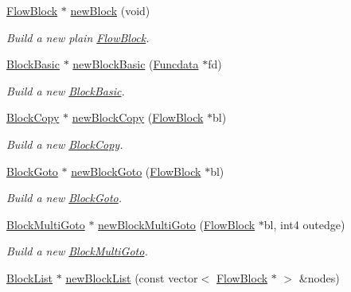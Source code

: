 \begin{DoxyCompactItemize}
\mbox{\hyperlink{class_flow_block}{Flow\+Block}} $\ast$ \mbox{\hyperlink{class_block_graph_aa8afd0ba5e6abe328dee3b21473f0e2c}{new\+Block}} (void)
\begin{DoxyCompactList}\small\item\em Build a new plain \mbox{\hyperlink{class_flow_block}{Flow\+Block}}. \end{DoxyCompactList}\item 
\mbox{\hyperlink{class_block_basic}{Block\+Basic}} $\ast$ \mbox{\hyperlink{class_block_graph_a0d05f223a305365c86c4b6efea82f1c0}{new\+Block\+Basic}} (\mbox{\hyperlink{class_funcdata}{Funcdata}} $\ast$fd)
\begin{DoxyCompactList}\small\item\em Build a new \mbox{\hyperlink{class_block_basic}{Block\+Basic}}. \end{DoxyCompactList}\item 
\mbox{\hyperlink{class_block_copy}{Block\+Copy}} $\ast$ \mbox{\hyperlink{class_block_graph_a29ab85a9a7a5d1f6785d2e93ce1e502d}{new\+Block\+Copy}} (\mbox{\hyperlink{class_flow_block}{Flow\+Block}} $\ast$bl)
\begin{DoxyCompactList}\small\item\em Build a new \mbox{\hyperlink{class_block_copy}{Block\+Copy}}. \end{DoxyCompactList}\item 
\mbox{\hyperlink{class_block_goto}{Block\+Goto}} $\ast$ \mbox{\hyperlink{class_block_graph_a1f0931166f699006e3a6335c60138ee7}{new\+Block\+Goto}} (\mbox{\hyperlink{class_flow_block}{Flow\+Block}} $\ast$bl)
\begin{DoxyCompactList}\small\item\em Build a new \mbox{\hyperlink{class_block_goto}{Block\+Goto}}. \end{DoxyCompactList}\item 
\mbox{\hyperlink{class_block_multi_goto}{Block\+Multi\+Goto}} $\ast$ \mbox{\hyperlink{class_block_graph_aea5dbfcf345da8fe5fa335b07613e1af}{new\+Block\+Multi\+Goto}} (\mbox{\hyperlink{class_flow_block}{Flow\+Block}} $\ast$bl, int4 outedge)
\begin{DoxyCompactList}\small\item\em Build a new \mbox{\hyperlink{class_block_multi_goto}{Block\+Multi\+Goto}}. \end{DoxyCompactList}\item 
\mbox{\hyperlink{class_block_list}{Block\+List}} $\ast$ \mbox{\hyperlink{class_block_graph_aafe64866a81e07fdb5eb92ab74a171ac}{new\+Block\+List}} (const vector$<$ \mbox{\hyperlink{class_flow_block}{Flow\+Block}} $\ast$ $>$ \&nodes)

\end{DoxyCompactItemize}
